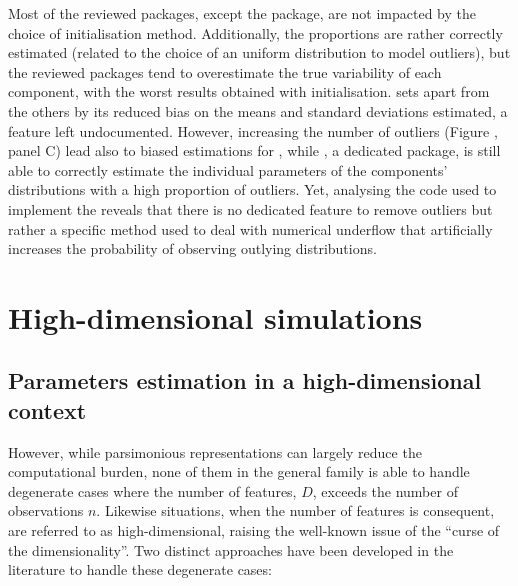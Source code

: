 Most of the reviewed packages, except the  package, are not
impacted by the choice of initialisation method. Additionally, the
proportions are rather correctly estimated (related to the choice of an
uniform distribution to model outliers), but the reviewed packages tend
to overestimate the true variability of each component, with the worst
results obtained with  initialisation.  sets apart
from the others by its reduced bias on the means and standard deviations
estimated, a feature left undocumented. However, increasing the number
of outliers (Figure , panel C) lead also to biased
estimations for , while , a dedicated package, is
still able to correctly estimate the individual parameters of the
components' distributions with a high proportion of outliers. Yet,
analysing the code used to implement the  reveals that there
is no dedicated feature to remove outliers but rather a specific method
used to deal with numerical underflow that artificially increases the
probability of observing outlying distributions.


\section{High-dimensional simulations}
\label{sec:high-dimensional-simulations}


\subsection{Parameters estimation in a high-dimensional context}
\label{subsec:high-dimensional}

However, while parsimonious representations can largely reduce the computational burden, none of them in the general family is able to handle degenerate cases where the number of features, \(D\), exceeds the number of observations \(n\). Likewise situations, when the number of features is consequent, are referred to as high-dimensional, raising the well-known issue of the ``curse of the dimensionality''. Two distinct approaches have been developed in the literature to handle these degenerate cases:

